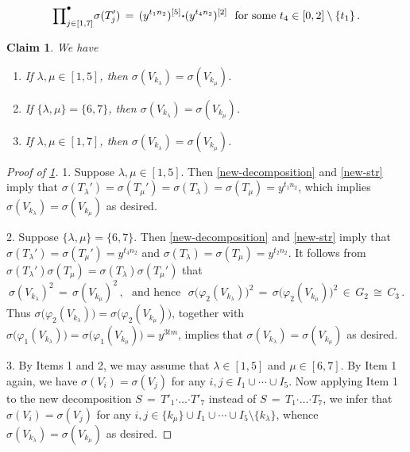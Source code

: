 \documentclass[10pt,a4paper]{amsart}
\newtheorem{claim}{Claim}
\def\bd{{\boldsymbol{\cdot}}}
\begin{document}
		\begin{equation}\label{new-str}
		{\small\prod}^{\bullet}_{j \in [1,7]} \sigma(T'_j) \, = \, (y^{t_1n_2})^{[5]} \bd (y^{t_4 n_2})^{[2]} \,\, \text{ for some  $t_4 \in [0,2]\setminus \{t_1\}$} \,.
		\end{equation}

		\begin{claim}\label{claim}
			We have
			\begin{enumerate}
				\item If $\lambda,\mu\in [1,5]$, then $\sigma(V_{k_{\lambda}})=\sigma(V_{k_{\mu}})$.
				
                \smallskip
				\item If $\{\lambda,\mu\}= \{6,7\}$, then $\sigma(V_{k_{\lambda}})=\sigma(V_{k_{\mu}})$.
				
                \smallskip
				\item If $\lambda,\mu\in [1,7]$, then $\sigma(V_{k_{\lambda}})=\sigma(V_{k_{\mu}})$.
			\end{enumerate}
		\end{claim}

		\begin{proof}[Proof of \ref{claim}]
			1. Suppose $\lambda,\mu\in [1,5]$. Then \eqref{new-decomposition} and \eqref{new-str} imply that $\sigma(T_{\lambda}')=\sigma(T_{\mu}')=\sigma(T_{\lambda})=\sigma(T_{\mu})=y^{t_1n_2}$, which implies $\sigma(V_{k_{\lambda}})=\sigma(V_{k_{\mu}})$ as desired.
			
			
			2. Suppose $\{\lambda,\mu\}= \{6,7\}$. Then \eqref{new-decomposition} and \eqref{new-str} imply that
			$\sigma(T_{\lambda}')=\sigma(T_{\mu}')=y^{t_4n_2}$ and $\sigma(T_{\lambda})=\sigma(T_{\mu})=y^{t_2n_2}$. It follows from $\sigma(T_{\lambda}')\sigma(T_{\mu})=\sigma(T_{\lambda})\sigma(T_{\mu}')$ that
		\[
		  \sigma(V_{k_{\lambda}})^{2} \, = \, \sigma(V_{k_{\mu}})^{2} \,, \,\, \text{ and hence } \,\, \sigma \big( \varphi_2(V_{k_{\lambda}}) \big)^{2} \, = \, \sigma \big( \varphi_2(V_{k_{\mu}}) \big)^{2} \, \in\,  G_2 \, \cong \, C_3 \,.
		\]
		Thus $\sigma \big( \varphi_2(V_{k_{\lambda}}) \big) = \sigma \big( \varphi_2(V_{k_{\mu}}) \big)$, together with $\sigma \big( \varphi_1(V_{k_{\lambda}}) \big) = \sigma \big( \varphi_1(V_{k_{\mu}}) \big) = y^{3tm}$, implies that $\sigma(V_{k_{\lambda}})=\sigma(V_{k_{\mu}})$ as desired.
		
		
		3. By Items 1 and 2, we may assume that $\lambda\in [1,5]$ and $\mu\in [6,7]$. By Item 1 again, we have $\sigma(V_i)=\sigma(V_j)$ for any $i,j\in I_1\cup\cdots\cup I_5$. Now applying Item 1 to  the new decomposition $S \, = \, T'_1 \bd \ldots \bd T'_7 $ instead of $S \, = \, T_1 \bd \ldots \bd T_7 $, we infer that $\sigma(V_i)=\sigma(V_j)$ for any $i,j\in \{k_{\mu}\}\cup I_1\cup\cdots\cup I_5\setminus \{k_{\lambda}\}$, whence $\sigma(V_{k_{\lambda}})=\sigma(V_{k_{\mu}})$ as desired.
		\qedhere[\ref{claim}]	
		\end{proof}
\end{document}
